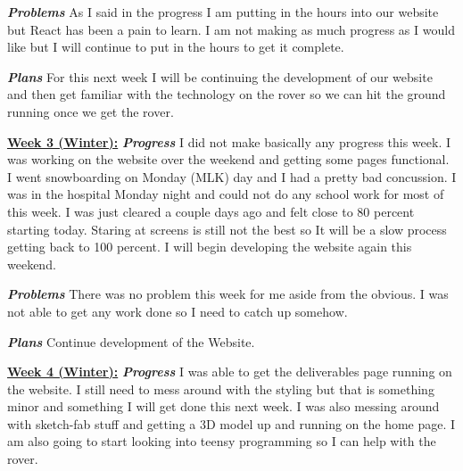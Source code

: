 \documentclass[onecolumn, draftclsnofoot, 10pt, compsoc]{IEEEtran}
\begin{document}
\textbf{\textit{{Problems}}}
\newline As I said in the progress I am putting in the hours into our website but React has been a pain to learn. I am not making as much progress as I would like but I will continue to put in the hours to get it complete. \newline 

\textbf{\textit{{Plans}}}
\newline For this next week I will be continuing the development of our website and then get familiar with the technology on the rover so we can hit the ground running once we get the rover. \newline 

\underline{\textbf{Week 3 (Winter):}}
\newline\textbf{\textit{{Progress}}}
\newline I did not make basically any progress this week. I was working on the website over the weekend and getting some pages functional. I went snowboarding on Monday (MLK) day and I had a pretty bad concussion. I was in the hospital Monday night and could not do any school work for most of this week. I was just cleared a couple days ago and felt close to 80 percent starting today. Staring at screens is still not the best so It will be a slow process getting back to 100 percent. I will begin developing the website again this weekend. \newline 

\textbf{\textit{{Problems}}}
\newline There was no problem this week for me aside from the obvious. I was not able to get any work done so I need to catch up somehow. \newline

\textbf{\textit{{Plans}}}
\newline Continue development of the Website. \newline 

\underline{\textbf{Week 4 (Winter):}}
\newline\textbf{\textit{{Progress}}}
\newline I was able to get the deliverables page running on the website. I still need to mess around with the styling but that is something minor and something I will get done this next week. I was also messing around with sketch-fab stuff and getting a 3D model up and running on the home page. I am also going to start looking into teensy programming so I can help with the rover.  \newline 
\end{document}
